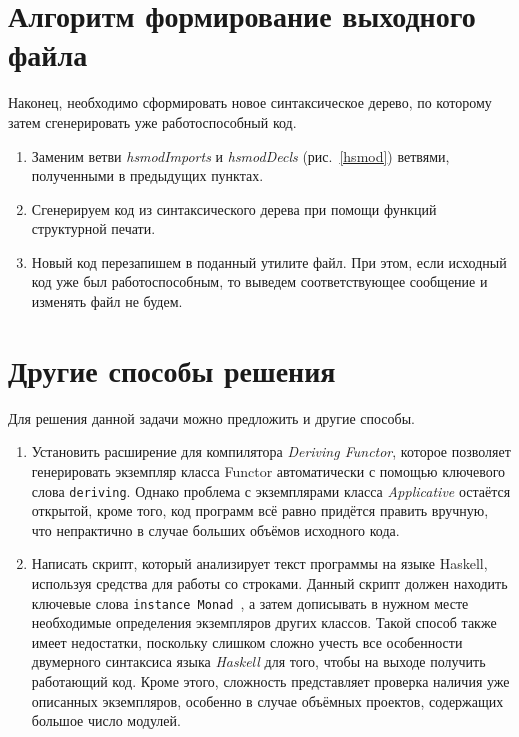 \section{Алгоритм формирование выходного файла}
Наконец, необходимо сформировать новое синтаксическое дерево, по которому затем сгенерировать уже работоспособный код.
\begin{enumerate}[1.]
    \item Заменим ветви \textit{hsmodImports} и \textit{hsmodDecls} (рис.~\ref{hsmod}) ветвями, полученными в предыдущих пунктах.
    \item Сгенерируем код из синтаксического дерева при помощи функций структурной печати.
    \item Новый код перезапишем в поданный утилите файл. При этом, если исходный код уже был работоспособным, то выведем соответствующее сообщение и изменять файл не будем.
\end{enumerate}

\section{Другие способы решения}
Для решения данной задачи можно предложить и другие способы.
\begin{enumerate}
\item Установить расширение для компилятора \textit{Deriving Functor}, которое позволяет генерировать экземпляр класса Functor автоматически с помощью ключевого слова \lstinline{deriving}. Однако проблема с экземплярами класса \textit{Applicative} остаётся открытой, кроме того, код программ всё равно придётся править вручную, что непрактично в случае больших объёмов исходного кода. 
\item Написать скрипт, который анализирует текст программы на языке Haskell, используя средства для работы со строками. Данный скрипт должен находить ключевые слова \lstinline{instance Monad}~, а затем дописывать в нужном месте необходимые определения экземпляров других классов. Такой способ также имеет недостатки, поскольку слишком сложно учесть все особенности двумерного синтаксиса языка \textit{Haskell} для того, чтобы на выходе получить работающий код. Кроме этого, сложность представляет проверка наличия уже описанных экземпляров, особенно в случае объёмных проектов, содержащих большое число модулей.
\end{enumerate}

